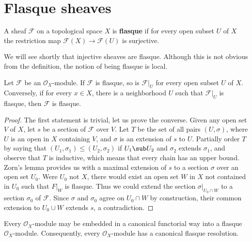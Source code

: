 \section{Flasque sheaves}
\begin{definition}
A sheaf $\mathscr{F}$ on a topological space $X$ is \textbf{flasque} if for every open subset $U$ of $X$ the restriction map $\mathscr{F}(X)\to\mathscr{F}(U)$ is surjective.
\end{definition}
We will see shortly that injective sheaves are flasque. Although this is not obvious from the definition, the notion of being flasque is local.
\begin{proposition}\label{flasque is local}
Let $\mathscr{F}$ be an $\mathscr{O}_X$-module. If $\mathscr{F}$ is flasque, so is $\mathscr{F}|_U$ for every open subset $U$ of $X$. Conversely, if for every $x\in X$, there is a neighborhood $U$ such that $\mathscr{F}|_U$ is flasque, then $\mathscr{F}$ is flasque.
\end{proposition}
\begin{proof}
The first statement is trivial, let us prove the converse. Given any open set $V$ of $X$, let $s$ be a section of $\mathscr{F}$ over $V$. Let $T$ be the set of all pairs $(U,\sigma)$, where $U$ is an open in $X$ containing $V$, and $\sigma$ is an extension of $s$ to $U$. Partially order $T$ by saying that $(U_1,\sigma_1)\leq(U_2,\sigma_2)$ if $U_1\sub U_2$ and $\sigma_2$ extends $\sigma_1$, and observe that $T$ is inductive, which means that every chain has an upper bound. Zorn's lemma provides us with a maximal extension of $s$ to a section $\sigma$ over an open set $U_0$. Were $U_0$ not $X$, there would exist an open set $W$ in $X$ not contained in $U_0$ such that $F|_W$ is flasque. Thus we could extend the section $\sigma|_{U_0\cap W}$ to a section $\sigma_0$ of $\mathscr{F}$. Since $\sigma$ and $\sigma_0$ agree on $U_0\cap W$ by construction, their common extension to $U_0\cup W$ extends $s$, a contradiction.
\end{proof}
\begin{proposition}
Every $\mathscr{O}_X$-module may be embedded in a canonical functorial way into a flasque $\mathscr{O}_X$-module. Consequently, every $\mathscr{O}_X$-module has a canonical flasque resolution.
\end{proposition}
